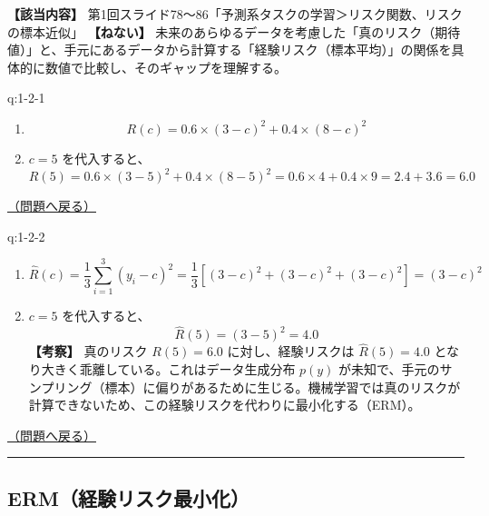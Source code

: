 \textbf{【該当内容】}
第1回スライド78〜86「予測系タスクの学習＞リスク関数、リスクの標本近似」
\textbf{【ねない】}
未来のあらゆるデータを考慮した「真のリスク（期待値）」と、手元にあるデータから計算する「経験リスク（標本平均）」の関係を具体的に数値で比較し、そのギャップを理解する。

\begin{answerbox}[phantomlabel=a:1-2-1]{q:1-2-1}

\begin{enumerate}
\def\labelenumi{\arabic{enumi}.}
\tightlist
\item
  \[R(c) = 0.6 \times (3 - c)^2 + 0.4 \times (8 - c)^2\]
\item
  \(c=5\) を代入すると、
  \[R(5) = 0.6 \times (3 - 5)^2 + 0.4 \times (8 - 5)^2 = 0.6 \times 4 + 0.4 \times 9 = 2.4 + 3.6 = 6.0\]
\end{enumerate}

\hfill 

\hyperref[q:1-2-1]{（問題へ戻る）}

\end{answerbox}

\begin{answerbox}[phantomlabel=a:1-2-2]{q:1-2-2}

\begin{enumerate}
\def\labelenumi{\arabic{enumi}.}
\tightlist
\item
  \[\hat{R}(c) = \frac{1}{3} \sum_{i=1}^3 (y_i - c)^2 = \frac{1}{3} \left[ (3-c)^2 + (3-c)^2 + (3-c)^2 \right] = (3-c)^2\]
\item
  \(c=5\) を代入すると、 \[\hat{R}(5) = (3-5)^2 = 4.0\]
  \textbf{【考察】} 真のリスク \(R(5)=6.0\) に対し、経験リスクは
  \(\hat{R}(5)=4.0\) となり大きく乖離している。これはデータ生成分布
  \(p(y)\)
  が未知で、手元のサンプリング（標本）に偏りがあるために生じる。機械学習では真のリスクが計算できないため、この経験リスクを代わりに最小化する（ERM）。
\end{enumerate}

\hfill 

\hyperref[q:1-2-2]{（問題へ戻る）}

\begin{center}\rule{0.5\linewidth}{0.5pt}\end{center}

\end{answerbox}

\subsection{ERM（経験リスク最小化）}\label{ermux7d4cux9a13ux30eaux30b9ux30afux6700ux5c0fux5316}

